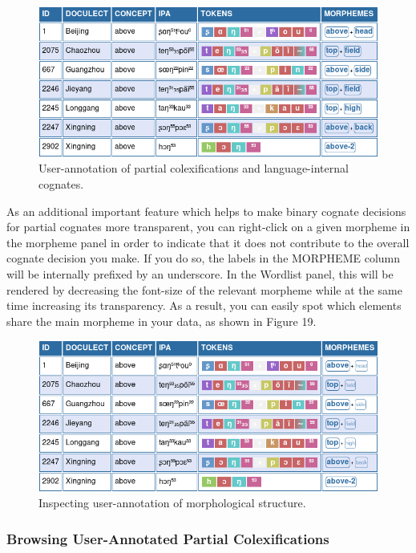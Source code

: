 \documentclass[a4paper,svgnames]{scrartcl}
\begin{document}
\begin{figure}
\centering
\includegraphics{images/figure-18.png}
\caption{User-annotation of partial colexifications and
language-internal cognates.}
\end{figure}

As an additional important feature which helps to make binary cognate
decisions for partial cognates more transparent, you can right-click on
a given morpheme in the morpheme panel in order to indicate that it does
not contribute to the overall cognate decision you make. If you do so,
the labels in the MORPHEME column will be internally prefixed by an
underscore. In the Wordlist panel, this will be rendered by decreasing
the font-size of the relevant morpheme while at the same time increasing
its transparency. As a result, you can easily spot which elements share
the main morpheme in your data, as shown in Figure 19.

\begin{figure}
\centering
\includegraphics{images/figure-19.png}
\caption{Inspecting user-annotation of morphological
structure.}
\end{figure}

\subsubsection{Browsing User-Annotated Partial
Colexifications}\label{browsing-user-annotated-partial-colexifications}
\end{document}
